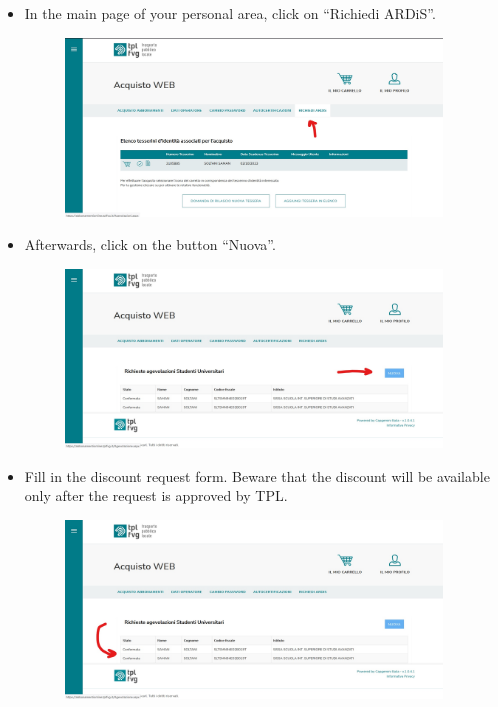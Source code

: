 \documentclass{sissavademecum}
\begin{document}
\begin{itemize}
    \item In the main page of your personal area, click on ``Richiedi ARDiS''.
    \begin{figure}[H]
        \begin{center}
            \includegraphics[width=10cm]{ardis_bus/s5.jpg}
        \end{center}
    \end{figure}
    \item Afterwards, click on the button ``Nuova''.
    \begin{figure}[H]
        \begin{center}
            \includegraphics[width=10cm]{ardis_bus/s6.jpg}
        \end{center}
    \end{figure}
    \item Fill in the discount request form. Beware that the discount will be available only after the request is approved by TPL.
    \begin{figure}[H]
        \begin{center}
            \includegraphics[width=10cm]{ardis_bus/s8.jpg}
        \end{center}
    \end{figure}
\end{itemize}
\end{document}
